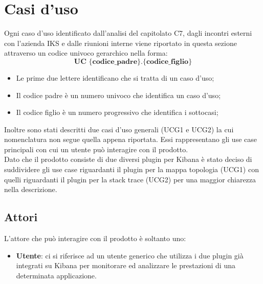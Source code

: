 
\section{Casi d'uso}
Ogni caso d'uso identificato dall'analisi del capitolato C7, dagli incontri esterni con l'azienda IKS e dalle riunioni interne viene riportato in questa sezione attraverso un codice univoco gerarchico nella forma:
 $$ \textbf{UC \{codice\_padre\}.\{codice\_figlio\}  } $$
\begin{itemize}
	\item Le prime due lettere identificano che si tratta di un caso d'uso;
	\item Il codice padre è un numero univoco che identifica un caso d'uso;
	\item Il codice figlio è un numero progressivo che identifica i sottocasi;\\
\end{itemize}

Inoltre sono stati descritti due casi d'uso generali (UCG1 e UCG2) la cui nomenclatura non segue quella appena riportata. Essi rappresentano gli use case principali con cui un utente può interagire con il prodotto. \\ Dato che il prodotto consiste di due diversi plugin per Kibana è stato deciso di suddividere gli use case riguardanti il plugin per la mappa topologia (UCG1) con quelli riguardanti il plugin per la stack trace (UCG2) per una maggior chiarezza nella descrizione.
\subsection{Attori} \label{attori}
L'attore che può interagire con il prodotto è soltanto uno:
\begin{itemize}
	\item \textbf{Utente}: ci si riferisce ad un utente generico che utilizza i due plugin già integrati su Kibana per monitorare ed analizzare le prestazioni di una determinata applicazione. 
\end{itemize}

 \hypertarget{UCG1}{}
